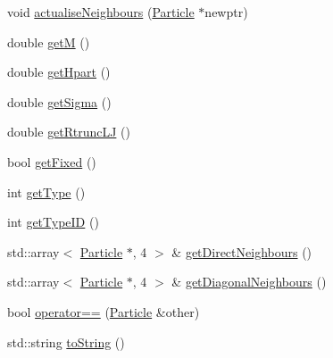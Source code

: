 \begin{DoxyCompactItemize}
void \hyperlink{classParticle_ad819812671e952af4aa2dc98b098586d}{actualise\+Neighbours} (\hyperlink{classParticle}{Particle} $\ast$newptr)
\item 
double \hyperlink{classParticle_aa1ca800f9be9dd4bd6c604f608095b24}{getM} ()
\item 
double \hyperlink{classParticle_a13b42f0d0766cd6f391962476033ee19}{get\+Hpart} ()
\item 
double \hyperlink{classParticle_af17968125ecd630dae78f90b88d0c339}{get\+Sigma} ()
\item 
double \hyperlink{classParticle_a700c3731f59f6865b4722849ce0a9243}{get\+Rtrunc\+LJ} ()
\item 
bool \hyperlink{classParticle_a50aaa2fc7f45ebabb09ec34e4501f45a}{get\+Fixed} ()
\item 
int \hyperlink{classParticle_a0581d7b629eb17ac5bef8e934852ca8b}{get\+Type} ()
\item 
int \hyperlink{classParticle_ad857b786f746a84e6cb19bbdadf8d404}{get\+Type\+ID} ()
\item 
std\+::array$<$ \hyperlink{classParticle}{Particle} $\ast$, 4 $>$ \& \hyperlink{classParticle_ab4c173183a5304a22dda80e03c50298a}{get\+Direct\+Neighbours} ()
\item 
std\+::array$<$ \hyperlink{classParticle}{Particle} $\ast$, 4 $>$ \& \hyperlink{classParticle_aefd56a4dcc71d75227203566d5deb566}{get\+Diagonal\+Neighbours} ()
\item 
bool \hyperlink{classParticle_a5034babb77618a56e00927d8891afabe}{operator==} (\hyperlink{classParticle}{Particle} \&other)
\item 
std\+::string \hyperlink{classParticle_a07d071a0f91f8ce7413201a6db3afe7b}{to\+String} ()
\end{DoxyCompactItemize}
